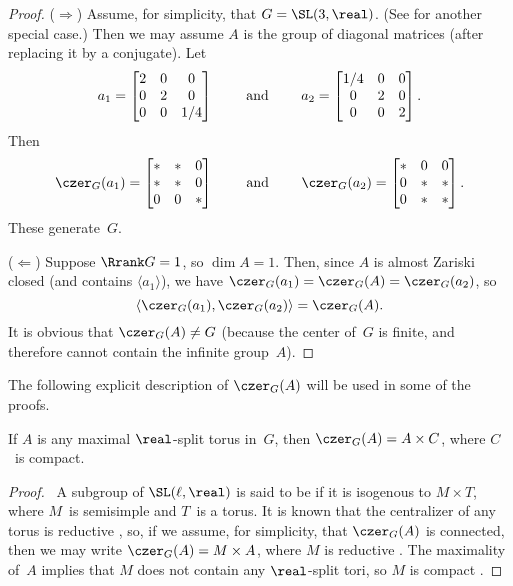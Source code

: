 \begin{proof}
($\Rightarrow$) Assume, for simplicity, that $G = \SL(3,\real)$.
(See  for another special case.) 
 Then we may assume $A$ is the group of diagonal matrices (after replacing it by a conjugate). Let
 $$ a_1 =
 \begin{bmatrix}
 2 & 0 & 0 \\
 0 & 2 & 0 \\
 0 & 0 & 1/4 
 \end{bmatrix}
 \mbox{ \qquad and \qquad }
 a_2 =
 \begin{bmatrix}
 1/4 & 0 & 0 \\
 0 & 2 & 0 \\
 0 & 0 & 2 
 \end{bmatrix}
 .$$
 Then
 $$ \czer_G(a_1) =
 \begin{bmatrix}
 * & * & 0 \\
 * & * & 0 \\
 0 & 0 & * 
 \end{bmatrix}
 \mbox{ \qquad and \qquad }
 \czer_G(a_2) =
 \begin{bmatrix}
 * & 0 & 0 \\
 0 & * & * \\
 0 & * & * 
 \end{bmatrix}
 .$$
 These generate~$G$.
 
 ($\Leftarrow$) Suppose $\Rrank G = 1$, so $\dim A = 1$. Then, since $A$ is almost Zariski closed (and contains $\langle a_1 \rangle$), we have 
 	$\czer_G(a_1) = \czer_G(A) = \czer_G(a_2)$,
so 
	$$\langle \czer_G(a_1) , \czer_G(a_2) \rangle = \czer_G(A) .$$
It is obvious that $\czer_G(A) \neq G$ (because the center of~$G$ is finite, and therefore cannot contain the infinite group~$A$).
\end{proof}

The following explicit description of $\czer_G(A)$ will be used in some of the proofs.

\begin{lem} \label{C(A)=AxC}
If $A$ is any maximal $\real$-split torus in~$G$, then $\czer_G(A) = A \times C$, where $C$~is compact.
\end{lem}

\begin{proof}[Proof]  \optional\ 
A subgroup of $\SL(\ell,\real)$ is said to be  if it is isogenous to $M \times T$, where $M$~is semisimple and $T$~is a torus. It is known that the centralizer of any torus is reductive , so, if we assume, for simplicity, that $\czer_G(A)$ is connected, then we may write $\czer_G(A) = M \times A$, where $M$ is reductive . The maximality of~$A$ implies that $M$ does not contain any $\real$-split tori, so $M$ is compact .
\end{proof}

